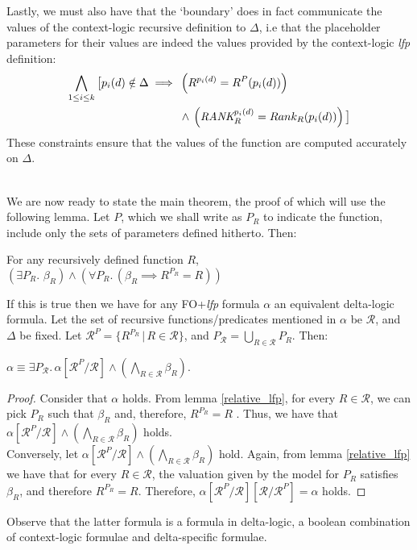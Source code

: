 Lastly, we must also have that the `boundary' does in fact communicate the values of the context-logic recursive definition to $\Delta{}$, i.e that the placeholder parameters for their values are indeed the values provided by the context-logic \textit{lfp} definition:\\ 
\begin{align*}
\bigwedge\limits_{1 \leq{} i \leq{} k} \big\lbrack{} p_i(d) \notin{} \Delta{} \implies{} & \left( R^{p_i(d)} =  R^{P}(p_i(d)) \right) \notag{}\\
& \land{} \left( \textit{RANK}_{R}^{p_i(d)} =  Rank_{R}(p_i(d)) \right) \big\rbrack{} \notag{} 
\end{align*}
These constraints ensure that the values of the function are computed accurately on $\Delta{}$.\\\

We are now ready to state the main theorem, the proof of which will use the following lemma. Let $P$, which we shall write as $P_{R}$ to indicate the function, include only the sets of parameters defined hitherto. Then: 

\begin{lemma}
\label{relative_lfp}
For any recursively defined function $R$, $\left(\exists{}P_{R}.\,\,\beta_{R} \right) \land{} \left(\forall{}P_{R}.\,\left(\beta_{R} \implies{} R^{P_{R}} = R\right) \right)$
\end{lemma}

If this is true then we have for any FO+\textit{lfp} formula $\alpha$ an equivalent delta-logic formula. Let the set of recursive functions/predicates mentioned in $\alpha{}$ be $\mathcal{R}$, and $\Delta{}$ be fixed. Let $\mathcal{R}^{P} = \{ R^{P_{R}} \,|\, R \in{} \mathcal{R}\}$, and $P_{\mathcal{R}} = \bigcup\limits_{R \in{} \mathcal{R}}P_{R}$. Then:\\

\begin{theorem}[Separability]
$\alpha{} \equiv{} \exists{}P_{\mathcal{R}}.\, \alpha[\mathcal{R}^{P}/\mathcal{R}] \land{} \left( \bigwedge\limits_{R \in{} \mathcal{R}} \beta_{R} \right)$.
\end{theorem}

\begin{proof}
Consider that $\alpha{}$ holds. From lemma \ref{relative_lfp}, for every $R \in{} \mathcal{R}$, we can pick $P_{R}$ such that $\beta_{R}$ and, therefore, $R^{P_{R}} = R$ . Thus, we have that $\alpha[\mathcal{R}^{P}/\mathcal{R}] \land{} \left( \bigwedge\limits_{R \in{} \mathcal{R}} \beta_{R}\right)$ holds.\\
Conversely, let $\alpha[\mathcal{R}^{P}/\mathcal{R}] \land{} \left( \bigwedge\limits_{R \in{} \mathcal{R}} \beta_{R} \right)$ hold. Again, from lemma \ref{relative_lfp} we have that for every $R \in{} \mathcal{R}$, the valuation given by the model for $P_{R}$ satisfies $\beta_{R}$, and therefore $R^{P_{R}} = R$. Therefore, $\alpha[\mathcal{R}^{P}/\mathcal{R}][\mathcal{R}/\mathcal{R}^{P}] = \alpha{}$ holds.
\end{proof}
Observe that the latter formula is a formula in delta-logic, a boolean combination of context-logic formulae and delta-specific formulae.